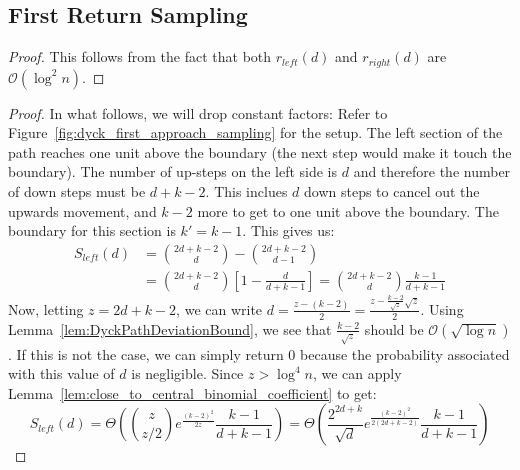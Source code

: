 \subsection{First Return Sampling}%
\label{sec:first_return_sampling}
\ReturnProbabilityBoundNotNormalized*
\begin{proof}
This follows from the fact that both $r_{left}(d)$ and $r_{right}(d)$ are $\mathcal O(\log^2 n)$.
\end{proof}

\ReturnDLeftBound*
\begin{proof}
In what follows, we will drop constant factors:
Refer to Figure~\ref{fig:dyck_first_approach_sampling} for the setup.
The left section of the path reaches one unit above the boundary (the next step would make it touch the boundary).
The number of up-steps on the left side is $d$ and therefore the number of down steps must be $d + k - 2$.
This inclues $d$ down steps to cancel out the upwards movement, and $k-2$ more to get to one unit above the boundary.
The boundary for this section is $k' = k-1$. This gives us:
\begin{align}
S_{left}(d) &= \binom{2d+k-2}{d} - \binom{2d+k-2}{d-1}\\
&= \binom{2d+k-2}{d}\left[ 1-\frac{d}{d+k-1}\right] = \binom{2d+k-2}{d}\frac{k-1}{d+k-1}
\end{align}
Now, letting $z = 2d+k-2$,  we can write $d = \frac{z-(k-2)}{2} = \frac{z-\frac{k-2}{\sqrt z}\sqrt z}{2}$.
Using Lemma~\ref{lem:DyckPathDeviationBound}, we see that $\frac{k-2}{\sqrt z}$ should be $\mathcal O(\sqrt{\log n})$.
If this is not the case, we can simply return $0$ because the probability associated with this value of $d$ is negligible.
Since $z > \log^4 n$, we can apply Lemma~\ref{lem:close_to_central_binomial_coefficient} to get:
\[
S_{left}(d) = \Theta\left( \binom{z}{z/2} e^{\frac{(k-2)^2}{2z}} \frac{k-1}{d+k-1} \right)
= \Theta\left( \frac{2^{2d+k}}{\sqrt d} e^{\frac{(k-2)^2}{2(2d+k-2)}} \frac{k-1}{d+k-1} \right)
\]
\end{proof}


